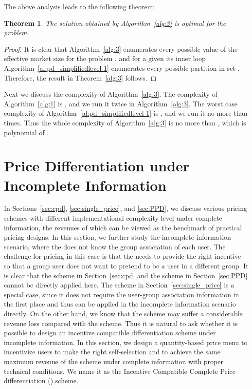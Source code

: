 \documentclass[twocolumn,10pt,twosided]{IEEEtran}
\newtheorem{theorem}{Theorem}
\begin{document}
The above analysis leads to the following theorem:
\begin{theorem}
The solution obtained by Algorithm~\ref{alg:3} is optimal for the  problem.
\end{theorem}

\begin{proof}
It is clear that Algorithm~\ref{alg:3} enumerates every possible value of the effective market size for the  problem , and for a given  its inner loop Algorithm~\ref{al:pd_simplifiedlevel-1} enumerates every possible partition in set . Therefore, the result in Theorem~\ref{alg:3} follows.
\end{proof}

Next we discuss the complexity of Algorithm~\ref{alg:3}. The complexity of Algorithm~\ref{alg:1} is , and we run it twice in Algorithm~\ref{alg:3}. The worst case complexity of  Algorithm~\ref{al:pd_simplifiedlevel-1}  is , and we run it no more than  times. Thus the whole complexity of Algorithm~\ref{alg:3} is no more than , which is polynomial of .


\section{Price Differentiation under Incomplete Information}
\label{sec:incomplete_information}
In Sections~\ref{sec:cpd}, \ref{sec:single_price}, and \ref{sec:PPD},
we discuss various pricing schemes with different implementational complexity level under complete information, the revenues of  which can be viewed as the benchmark of practical pricing designs. In this section, we further study the incomplete information scenario, where the  does not know the group association of each user. The challenge for pricing in this case is that the  needs to provide the right incentive so that a group  user does not want to pretend to be a user in a different group. It is clear that the  scheme in Section~\ref{sec:cpd} and the  scheme in Section~\ref{sec:PPD} cannot be directly applied here. The  scheme in Section~\ref{sec:single_price} is a special case, since it does not require the user-group association information in the first place and thus can be applied in the incomplete information scenario directly. On the other hand, we know that the  scheme may suffer a considerable revenue loss compared with the  scheme. Thus it is natural to ask whether it is possible to design an incentive compatible differentiation scheme under incomplete information.
In this section, we design a quantity-based price menu to incentivize users to make the right self-selection and to achieve the same maximum revenue of the  scheme under complete information with proper technical conditions.  We name it as the Incentive Compatible Complete Price differentiation () scheme.
\end{document}
